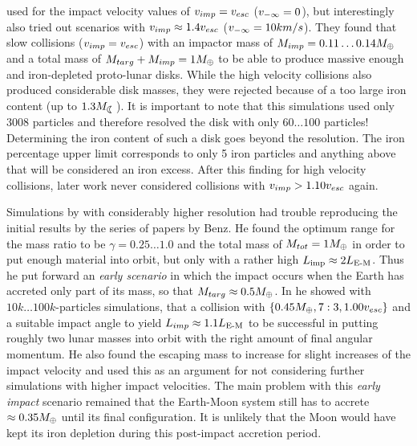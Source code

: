\cite{Benz:1989p1893} used for the impact velocity values of $v_{imp} = v_{esc}$ ($v_{-\infty} = 0$), but interestingly also tried out scenarios with $v_{imp} \approx 1.4 v_{esc}$ ($v_{-\infty} = 10km/s$). They found that slow collisions ($v_{imp} = v_{esc}$) with an impactor mass of $M_{imp} = 0.11 \dots 0.14 M_{\oplus}$ and a total mass of $M_{targ} + M_{imp} = 1 M_{\oplus}$ to be able to produce massive enough and iron-depleted proto-lunar disks. While the high velocity collisions also produced considerable disk masses, they were rejected because of a too large iron content (up to $1.3 \ML$). It is important to note that this simulations used only $3008$ particles and therefore resolved the disk with only $60 \dots 100$ particles! Determining the iron content of such a disk goes beyond the resolution. The iron percentage upper limit corresponds to only 5 iron particles and anything above that will be considered an iron excess. After this finding for high velocity collisions, later work never considered collisions with $v_{imp} > 1.10 v_{esc}$ again.

Simulations by \cite{1997Icar..126..126C} with considerably higher resolution had trouble reproducing the initial results by the series of papers by Benz. He found the optimum range for the mass ratio to be $\gamma = 0.25 \dots 1.0$ and the total mass of $M_{tot} = 1 M_{\oplus}$ in order to put enough material into orbit, but only with a rather high $L_{\textrm{imp}} \approx 2 L_{\textrm{E-M}}$. Thus he put forward an \emph{early scenario} in which the impact occurs when the Earth has accreted only part of its mass, so that $M_{targ} \approx 0.5 M_{\oplus}$. In \cite{Cameron:2000p1854} he showed with $10k \dots100k$-particles simulations, that a collision with $\{0.45 M_{\oplus}, 7:3, 1.00 v_{esc} \}$ and a suitable impact angle to yield $L_{imp} \approx 1.1 L_{\textrm{E-M}}$ to be successful in  putting roughly two lunar masses into orbit with the right amount of final angular momentum. He also found the escaping mass to increase for slight increases of the impact velocity and used this as an argument for not considering further simulations with higher impact velocities. The main problem with this \emph{early impact} scenario remained that the Earth-Moon system still has to accrete $\approx 0.35 M_{\oplus}$ until its final configuration. It is unlikely that the Moon would have kept its iron depletion during this post-impact accretion period.

